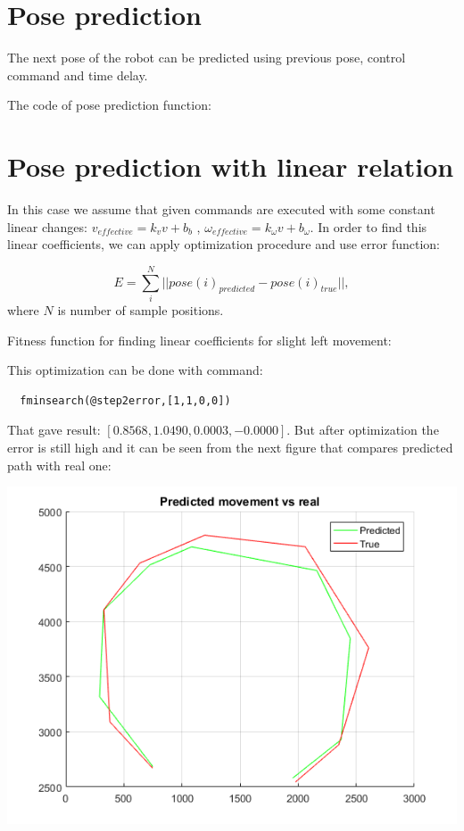 \documentclass[a4paper, 12pt]{article}
\begin{document}


\section{Pose prediction}
The next pose of the robot can be predicted using previous pose, control command and time delay.

The code of pose prediction function:



\section{Pose prediction with linear relation}

In this case we assume that given commands are executed with some constant linear changes: $v_{effective} =k_v v+b_b $ , $\omega_{effective} =k_{\omega} v+b_{\omega} $. In order to find this linear coefficients, we can apply optimization procedure and use error function: 

\begin{equation}
E = \sum\limits_i^N ||pose(i)_{predicted} - pose(i)_{true}||,
\end{equation}
where $N$ is number of sample positions.

Fitness function for finding linear coefficients for slight left movement:




This optimization can be done with command:
\begin{lstlisting}
  fminsearch(@step2error,[1,1,0,0])
\end{lstlisting}
That gave result: $[0.8568,    1.0490,    0.0003,   -0.0000]$. But after optimization the error is still high and it can be seen from the next figure that compares predicted path with real one:

\includegraphics[scale = 1]{step2error.png}
\end{document}
